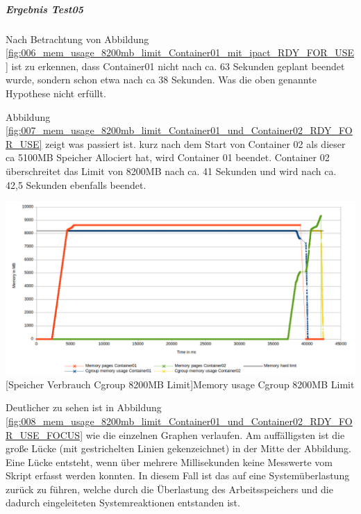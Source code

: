 \subparagraph{Ergebnis Test05}
Nach Betrachtung von Abbildung \ref{fig:006_mem_usage_8200mb_limit_Container01_mit_ipact_RDY_FOR_USE} ist zu erkennen, dass Container01 nicht nach ca. 63 Sekunden geplant beendet wurde, sondern schon etwa nach ca 38 Sekunden. Was die oben genannte Hypothese nicht erfüllt.

Abbildung \ref{fig:007_mem_usage_8200mb_limit_Container01_und_Container02_RDY_FOR_USE} zeigt was passiert ist. kurz nach dem Start von Container 02 als dieser ca 5100MB Speicher Allociert hat, wird Container 01 beendet. Container 02 überschreitet das Limit von 8200MB nach ca. 41 Sekunden und wird nach ca. 42,5 Sekunden ebenfalls beendet.

\vspace{1em}
\begin{minipage}{\linewidth}
	\centering
	\includegraphics[width=1\linewidth]{pics/007_mem_usage_8200mb_limit_Container01_und_Container02_RDY_FOR_USE.png}
	[Speicher Verbrauch Cgroup 8200MB Limit]{Memory usage Cgroup 8200MB Limit}
	\label{fig:007_mem_usage_8200mb_limit_Container01_und_Container02_RDY_FOR_USE}
\end{minipage}

Deutlicher zu sehen ist in Abbildung \ref{fig:008_mem_usage_8200mb_limit_Container01_und_Container02_RDY_FOR_USE_FOCUS} wie die einzelnen Graphen verlaufen. Am auffälligsten ist die große Lücke (mit gestrichelten Linien gekenzeichnet) in der Mitte der Abbildung. Eine Lücke entsteht, wenn über mehrere Millisekunden keine Messwerte vom Skript erfasst werden konnten. In diesem Fall ist das auf eine Systemüberlastung zurück zu führen, welche durch die Überlastung des Arbeitsspeichers und die dadurch eingeleiteten Systemreaktionen entstanden ist. 

